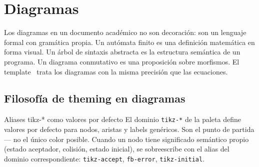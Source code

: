 \chapter{Diagramas}
\label{ch:diagramas}

Los diagramas en un documento académico no son decoración: son un lenguaje
formal con gramática propia. Un autómata finito es una definición matemática
en forma visual. Un árbol de sintaxis abstracta es la estructura semántica
de un programa. Un diagrama conmutativo es una proposición sobre morfismos.
El template~\cite{tikz2023} trata los diagramas con la misma precisión
que las ecuaciones.

\section{Filosofía de theming en diagramas}
\label{sec:tikz-filosofia}

\begin{definicion}{Aliases tikz-* como valores por defecto}
\label{def:tikz-aliases}
El dominio \texttt{tikz-*} de la paleta define valores por defecto para
nodos, aristas y labels genéricos. Son el punto de partida — no el único
color posible. Cuando un nodo tiene significado semántico propio
(estado aceptador, colisión, estado inicial), se sobreescribe con el
alias del dominio correspondiente: \texttt{tikz-accept}, \texttt{fb-error},
\texttt{tikz-initial}.
\end{definicion}

